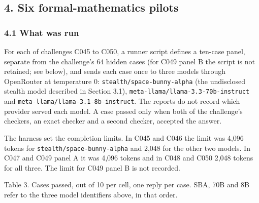 \documentclass[
  11pt,
]{article}
\begin{document}
\hypertarget{six-formal-mathematics-pilots}{%
\subsection{4. Six formal-mathematics
pilots}\label{six-formal-mathematics-pilots}}

\hypertarget{what-was-run-1}{%
\subsubsection{4.1 What was run}\label{what-was-run-1}}

For each of challenges C045 to C050, a runner script defines a ten-case
panel, separate from the challenge's 64 hidden cases (for C049 panel B
the script is not retained; see below), and sends each case once to
three models through OpenRouter at temperature 0:
\texttt{stealth/\allowbreak{}space-\allowbreak{}bunny-\allowbreak{}alpha}
(the undisclosed stealth model described in Section 3.1),
\texttt{meta-\allowbreak{}llama/\allowbreak{}llama-\allowbreak{}3.3-\allowbreak{}70b-\allowbreak{}instruct}
and
\texttt{meta-\allowbreak{}llama/\allowbreak{}llama-\allowbreak{}3.1-\allowbreak{}8b-\allowbreak{}instruct}.
The reports do not record which provider served each model. A case
passed only when both of the challenge's checkers, an exact checker and
a second checker, accepted the answer.

The harness set the completion limits. In C045 and C046 the limit was
4,096 tokens for
\texttt{stealth/\allowbreak{}space-\allowbreak{}bunny-\allowbreak{}alpha}
and 2,048 for the other two models. In C047 and C049 panel A it was
4,096 tokens and in C048 and C050 2,048 tokens for all three. The limit
for C049 panel B is not recorded.


Table 3. Cases passed, out of 10 per cell, one reply per case. SBA, 70B
and 8B refer to the three model identifiers above, in that order.
\end{document}
